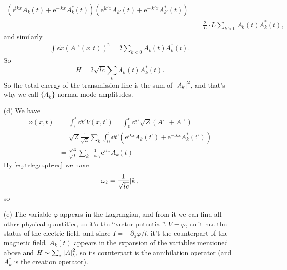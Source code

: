 \documentclass[hyperref, a4paper]{article}
\newcommand*{\ii}{\mathrm{i}}
\newcommand*{\ee}{\mathrm{e}}
\begin{document}
\begin{itemize}
\[\begin{aligned}
        (\ee^{\ii k x} A_k(t) + \ee^{- \ii k x} A_k^*(t))
        (\ee^{\ii k' x} A_{k'}(t) + \ee^{- \ii k' x} A_{k'}^*(t)) \\
        &= \frac{2}{L} \cdot L \sum_{k > 0} A_k(t) A_k^*(t),
    \end{aligned}
\]
and similarly 
\[
    \begin{aligned}
        \int \dd{x} (A^{\rightarrow}(x, t))^2 = 
        2 \sum_{k < 0} A_k(t) A_k^*(t).
    \end{aligned}
\]
So 
\begin{equation}
    H = 2 \sqrt{lc} \sum_k A_k(t) A_k^*(t). 
    \label{eq:circuit-ham}
\end{equation}
So the total energy of the transmission line 
is the sum of $\abs{A_k}^2$,
and that's why we call $\{A_k\}$ normal mode amplitudes.

\item[(d)] We have 
\[
    \begin{aligned}
        \varphi(x, t) &= \int_0^{t} \dd{t'} V(x, t')
        = \int_0^t \dd{t'} \sqrt{Z} (A^\leftarrow + A^\rightarrow) \\
        &= \sqrt{Z} \frac{1}{\sqrt{L}} \sum_{k} \int_0^t \dd{t'} (\ee^{\ii k x} A_k(t') + \ee^{- \ii k x} A_k^*(t')) \\
        &= \frac{\sqrt{Z}}{\sqrt{L}} \sum_k \frac{1}{- \ii \omega_k} \ee^{\ii k x} A_k(t)
    \end{aligned}
\]
By \eqref{eq:telegraph-eq} we have 
\begin{equation}
    \omega_k = \frac{1}{\sqrt{lc}} \abs{k},
\end{equation}
so 

\item[(e)] The variable $\varphi$ appears in the Lagrangian,
and from it we can find all other physical quantities,
so it's the ``vector potential''.
$V = \dot{\varphi}$, 
so it has the status of the electric field, 
and since $I = - \partial_x \varphi / l$,
it't the counterpart of the magnetic field.
$A_{k}(t)$ appears in the expansion of the variables mentioned above 
and $H \sim \sum_{k} \abs{A}_k^2$,
so its counterpart is the annihilation operator
(and $A^*_k$ is the creation operator).


\end{itemize}
\end{document}
